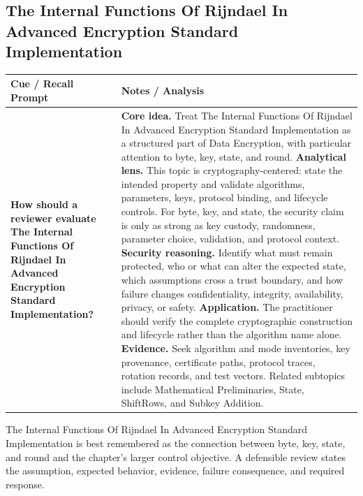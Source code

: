 \documentclass[11pt]{article}
\newcommand{\CornellHeader}{%
\rowcolor{Navy}\color{white}\bfseries Cue / Recall Prompt & \color{white}\bfseries Notes / Analysis\\\hline}
\newcommand{\CornellRow}[2]{%
\cellcolor{CueGray}\RaggedRight\textbf{#1} & \RaggedRight #2\\\hline}
\begin{document}
\subsection*{The Internal Functions Of Rijndael In Advanced Encryption Standard Implementation}
\begin{longtable}{>{\RaggedRight\arraybackslash}p{}|>{\RaggedRight\arraybackslash}p{}}
\CornellHeader
\CornellRow{How should a reviewer evaluate The Internal Functions Of Rijndael In Advanced Encryption Standard Implementation?}{\textbf{Core idea.} Treat The Internal Functions Of Rijndael In Advanced Encryption Standard Implementation as a structured part of Data Encryption, with particular attention to byte, key, state, and round. \textbf{Analytical lens.} This topic is cryptography-centered: state the intended property and validate algorithms, parameters, keys, protocol binding, and lifecycle controls. For byte, key, and state, the security claim is only as strong as key custody, randomness, parameter choice, validation, and protocol context. \textbf{Security reasoning.} Identify what must remain protected, who or what can alter the expected state, which assumptions cross a trust boundary, and how failure changes confidentiality, integrity, availability, privacy, or safety. \textbf{Application.} The practitioner should verify the complete cryptographic construction and lifecycle rather than the algorithm name alone. \textbf{Evidence.} Seek algorithm and mode inventories, key provenance, certificate paths, protocol traces, rotation records, and test vectors. Related subtopics include Mathematical Preliminaries, State, ShiftRows, and Subkey Addition.}
\end{longtable}
\begin{topicsummary}
The Internal Functions Of Rijndael In Advanced Encryption Standard Implementation is best remembered as the connection between byte, key, state, and round and the chapter's larger control objective. A defensible review states the assumption, expected behavior, evidence, failure consequence, and required response.
\end{topicsummary}
\end{document}
